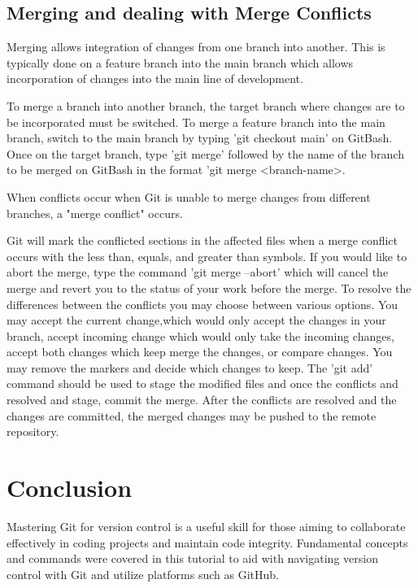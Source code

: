 \documentclass[10pt,twocolumn]{article}
\begin{document}
\subsection {Merging and dealing with Merge Conflicts}
Merging allows integration of changes from one branch into another. This is typically done on a feature branch into the main branch which allows incorporation of changes into the main line of development. 

To merge a branch into another branch, the target branch where changes are to be incorporated must be switched. To merge a feature branch into the main branch, switch to the main branch by typing 'git checkout main' on GitBash. Once on the target branch, type 'git merge' followed by the name of the branch to be merged on GitBash in the format 'git merge <branch-name>.

When conflicts occur when Git is unable to merge changes from different branches, a "merge conflict" occurs.

Git will mark the conflicted sections in the affected files when a merge conflict occurs with the less than, equals, and greater than symbols. If you would like to abort the merge, type the command 'git merge --abort' which will cancel the merge and revert you to the status of your work before the merge.  To resolve the differences between the conflicts you may choose between various options. You may accept the current change,which would only accept the changes in your branch, accept incoming change which would only take the incoming changes, accept both changes which keep merge the changes, or compare changes. You may remove the markers and decide which changes to keep. The 'git add' command should be used to stage the modified files and once the conflicts and resolved and stage, commit the merge. After the conflicts are resolved and the changes are committed, the merged changes may be pushed to the remote repository. 
\section{Conclusion}
Mastering Git for version control is a useful skill for those aiming to collaborate effectively in coding projects and maintain code integrity. Fundamental concepts and commands were covered in this tutorial to aid with navigating version control with Git and utilize platforms such as GitHub. 
\newpage
\end{document}
